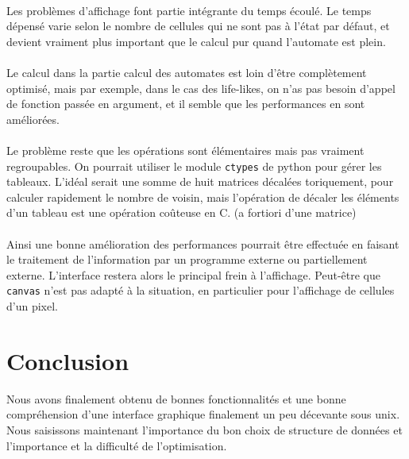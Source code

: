 \documentclass[a4paper]{article}
\begin{document}
\paragraph{} Les problèmes d'affichage font partie intégrante du temps écoulé. Le temps dépensé varie selon le nombre de cellules qui ne sont pas à l'état par défaut, et devient vraiment plus important que le calcul pur quand l'automate est plein.

\paragraph{} Le calcul dans la partie calcul des automates est loin d'être complètement optimisé, mais par exemple, dans le cas des life-likes, on n'as pas besoin d'appel de fonction passée en argument, et il semble que les performances en sont améliorées.

\paragraph{} Le problème reste que les opérations sont élémentaires mais pas vraiment regroupables. On pourrait utiliser le module {\tt ctypes} de python pour gérer les tableaux. L'idéal serait une somme de huit matrices décalées toriquement, pour calculer rapidement le nombre de voisin, mais l'opération de décaler les éléments d'un tableau est une opération coûteuse en C. (a fortiori d'une matrice)

\paragraph{} Ainsi une bonne amélioration des performances pourrait être effectuée en faisant le traitement de l'information par un programme externe ou partiellement externe. L'interface restera alors le principal frein à l'affichage. Peut-être que {\tt canvas} n'est pas adapté à la situation, en particulier pour l'affichage de cellules d'un pixel.

\section*{Conclusion}

Nous avons finalement obtenu de bonnes fonctionnalités et une bonne compréhension d'une interface graphique finalement un peu décevante sous unix. Nous saisissons maintenant l'importance du bon choix de structure de données et l'importance et la difficulté de l'optimisation.
\end{document}
